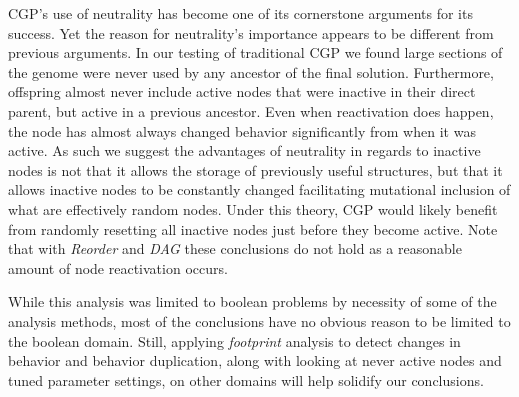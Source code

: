 \documentclass[journal]{IEEEtran}
\begin{document}
CGP's use of neutrality has become one of its cornerstone arguments for its success.
Yet the reason for neutrality's importance appears to be different from previous
arguments.  In our testing of traditional CGP we found large sections of the
genome were never used by any ancestor of the final solution.  Furthermore,
offspring almost never include active nodes that were inactive in their direct
parent, but active in a previous ancestor.  Even when reactivation does happen,
the node has almost always changed behavior significantly from when it was active.
As such we suggest the advantages of neutrality in regards to inactive nodes is
not that it allows the storage of previously useful structures, but that it allows
inactive nodes to be constantly changed facilitating mutational inclusion of what
are effectively random nodes.  Under this theory, CGP would likely benefit from randomly resetting
all inactive nodes just before they become active.  Note that with \emph{Reorder}
and \emph{DAG} these conclusions do not hold as a reasonable amount of node
reactivation occurs.

While this analysis was limited to boolean problems by necessity of some of
the analysis methods, most of the conclusions have no obvious reason to be
limited to the boolean domain.  Still, applying \emph{footprint} analysis
to detect changes in behavior and behavior duplication, along with looking at
never active nodes and tuned parameter settings, on other domains will help
solidify our conclusions.


%
\end{document}
